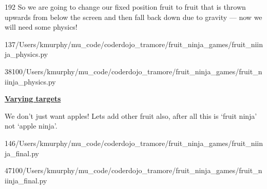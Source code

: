\documentclass{coderdojo}
\def\MUcode{/Users/kmurphy/mu_code/coderdojo_tramore/fruit_ninja_games/}
\newcommand\contentsitem[2]{
	\item \hyperref[#1]{\color{section}\bfseries #2}
}
\begin{document}
\begin{dingautolist}{192}
So we are going to change our fixed position fruit to fruit that is thrown upwards from below the screen and then fall back down due to gravity --- now we will need some physics!

	{1}{37}{\MUcode}{fruit_niinja_physics.py}  

	{38}{100}{\MUcode}{fruit_niinja_physics.py}  
	

\clearpage
	
\contentsitem{rectangle}{Varying targets} 

We don't just want apples! Lets add other fruit also, after all this is `fruit ninja' not `apple ninja'.

	{1}{46}{\MUcode}{fruit_niinja_final.py}  
	
	{47}{100}{\MUcode}{fruit_niinja_final.py}  
	
\clearpage

\end{dingautolist}
\end{document}
